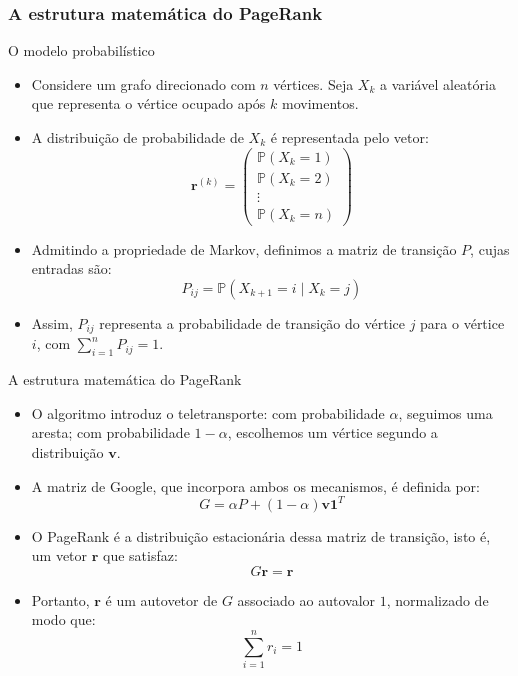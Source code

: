 \documentclass[aspectratio=1610,10pt]{beamer}
\begin{document}
\subsubsection{A estrutura matemática do PageRank}

\begin{frame}{O modelo probabilístico}
\begin{itemize}
    \setlength{\itemsep}{\medskipamount}
    \item Considere um grafo direcionado com $n$ vértices.
    Seja $X_k$ a variável aleatória que representa
    o vértice ocupado após $k$ movimentos.

    \item A distribuição de probabilidade de $X_k$
    é representada pelo vetor:
    \[
    \mathbf{r}^{(k)} =
    \begin{pmatrix}
    \mathbb{P}(X_k=1)\\
    \mathbb{P}(X_k=2)\\
    \vdots\\
    \mathbb{P}(X_k=n)
    \end{pmatrix}
    \]

    \item Admitindo a propriedade de Markov, definimos
    a matriz de transição $P$, cujas entradas são:
    \[
    P_{ij} = \mathbb{P}(X_{k+1}=i\mid X_k=j)
    \]

    \item Assim, $P_{ij}$ representa a probabilidade
    de transição do vértice $j$ para o vértice $i$,
    com $\sum_{i=1}^{n}P_{ij}=1$.
\end{itemize}
\end{frame}


\begin{frame}{A estrutura matemática do PageRank}
\begin{itemize}
    \setlength{\itemsep}{\medskipamount}
    \item O algoritmo introduz o teletransporte:
    com probabilidade $\alpha$, seguimos uma aresta;
    com probabilidade $1-\alpha$, escolhemos um vértice
    segundo a distribuição $\mathbf{v}$.

    \item A matriz de Google, que incorpora ambos
    os mecanismos, é definida por:
    \[
    G = \alpha P + (1-\alpha)\mathbf{v}\mathbf{1}^{T}
    \]

    \item O PageRank é a distribuição estacionária
    dessa matriz de transição, isto é, um vetor
    $\mathbf{r}$ que satisfaz:
    \[
    G\mathbf{r}=\mathbf{r}
    \]

    \item Portanto, $\mathbf{r}$ é um autovetor de $G$
    associado ao autovalor $1$, normalizado de modo que:
    \[
    \sum_{i=1}^{n}r_i=1
    \]
\end{itemize}
\end{frame}
\end{document}
